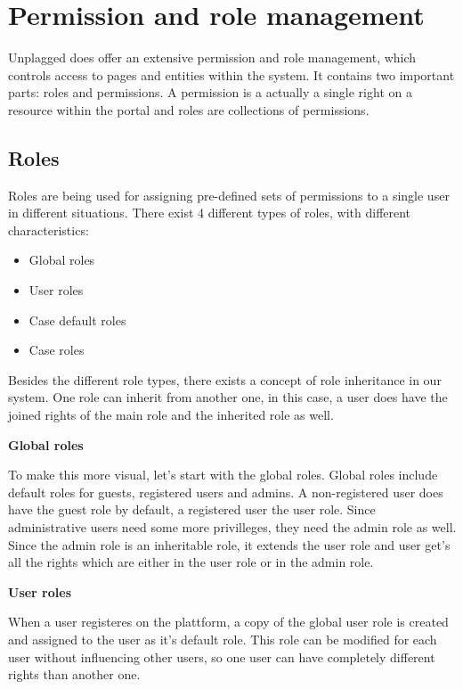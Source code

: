 \section{Permission and role management}

Unplagged does offer an extensive permission and role management, which controls access to pages and entities within the system. It contains two important parts: roles and permissions. A permission is a actually a single right on a resource within the portal and roles are collections of permissions.

\subsection{Roles}

Roles are being used for assigning pre-defined sets of permissions to a single user in different situations. There exist 4 different types of roles, with different characteristics:

\begin{itemize}
\item    	Global roles
\item   	User roles  
\item    	Case default roles
\item   	Case roles
\end{itemize}

Besides the different role types, there exists a concept of role inheritance in our system. One role can inherit from another one, in this case, a user does have the joined rights of the main role and the inherited role as well. 

\textbf{Global roles}

To make this more visual, let's start with the global roles. Global roles include default roles for guests, registered users and admins. A non-registered user does have the guest role by default, a registered user the user role. Since administrative users need some more privilleges, they need the admin role as well. Since the admin role is an inheritable role, it extends the user role and user get's all the rights which are either in the user role or in the admin role.

\textbf{User roles}

When a user registeres on the plattform, a copy of the global user role is created and assigned to the user as it's default role. This role can be modified for each user without influencing other users, so one user can have completely different rights than another one.

